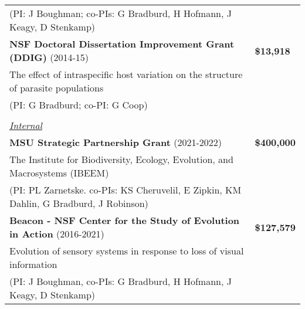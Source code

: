\documentclass{article}
\begin{document}
\begin{longtable}{>{\everypar{\dohang}\dohang\raggedright\arraybackslash}p{}p{}}
\hspace{4.5mm}(PI: J Boughman; co-PIs: G Bradburd, H Hofmann, J Keagy, D Stenkamp)\\ \vspace{-0.1cm}
%
\textbf{NSF Doctoral Dissertation Improvement Grant (DDIG)} (2014-15) & \hfill \textbf{\$13,918}\\
\hspace{4.5mm}The effect of intraspecific host variation on the structure of parasite populations\\
\hspace{4.5mm}(PI: G Bradburd; co-PI: G Coop)\\ \vspace{-0.1cm}\\

\textit{\underline{Internal}}\\
\textbf{MSU Strategic Partnership Grant} (2021-2022) & \hfill \textbf{\$400,000}\\
\hspace{4.5mm}The Institute for Biodiversity, Ecology, Evolution, and Macrosystems (IBEEM)\\
\hspace{4.5mm}(PI: PL Zarnetske. co-PIs: KS Cheruvelil, E Zipkin, KM Dahlin, G Bradburd, J Robinson)\\ \vspace{-0.1cm}

\textbf{Beacon - NSF Center for the Study of Evolution in Action} (2016-2021) & \hfill \textbf{\$127,579}\\
\hspace{4.5mm}Evolution of sensory systems in response to loss of visual information\\
\hspace{4.5mm}(PI: J Boughman, co-PIs: G Bradburd, H Hofmann, J Keagy, D Stenkamp)\\
%
\end{longtable}
\vspace{-0.3cm}
\end{document}
